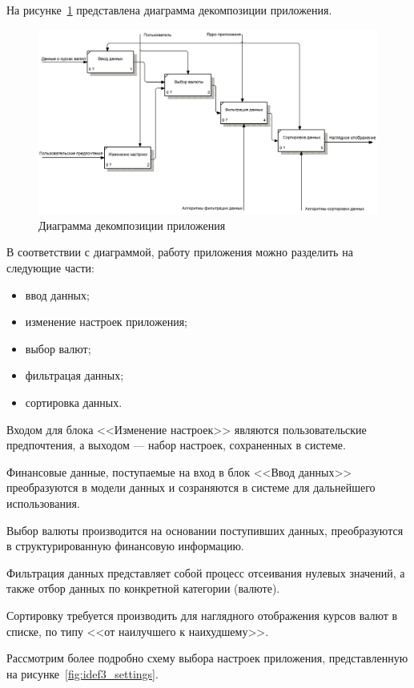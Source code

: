 \pagebreak
На рисунке~\ref{fig:idef0_app} представлена диаграмма декомпозиции
приложения.

\begin{figure}[h!]
  \centering
  \includegraphics[width=150mm]{pic/IDEF0_decomposition}
  \caption{Диаграмма декомпозиции приложения}
  \label{fig:idef0_app}
\end{figure}

В соответствии с диаграммой, работу приложения можно разделить
на следующие части:
\begin{itemize}
  \item ввод данных;
  \item изменение настроек приложения;
  \item выбор валют;
  \item фильтрацая данных;
  \item сортировка данных.
\end{itemize}

Входом для блока <<Изменение настроек>> являются пользовательские
предпочтения, а выходом --- набор настроек, сохраненных в системе.

Финансовые данные, поступаемые на вход в блок <<Ввод данных>>
преобразуются в модели данных и созраняются в системе
для дальнейшего использования.

Выбор валюты производится на основании поступивших данных,
преобразуются в структурированную финансовую информацию.

Фильтрация данных представляет собой процесс отсеивания нулевых
значений, а также отбор данных по конкретной категории (валюте). 

Сортировку требуется производить для наглядного отображения курсов
валют в списке, по типу <<от наилучшего к наихудшему>>.


\pagebreak
Рассмотрим более подробно схему выбора настроек приложения,
представленную на рисунке~\ref{fig:idef3_settings}.

